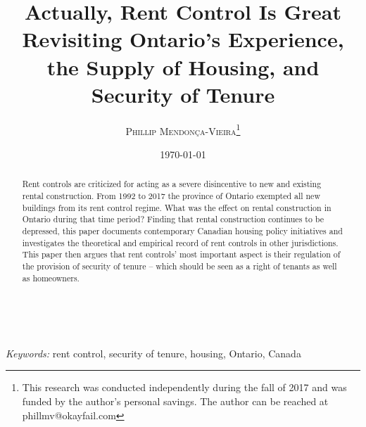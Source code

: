 \documentclass[letterpaper,12pt]{article} %
\title{\textsf{\textbf{Actually, Rent Control Is Great}\\ %
Revisiting Ontario's Experience, the Supply of Housing, and Security of Tenure}} %
\author{\textsc{Phillip Mendonça-Vieira}\footnote{ This research was conducted independently during the fall of 2017 and was funded by the author's personal savings. The author can be reached at phillmv@okayfail.com}}
\date{\today} %
\makeatletter
\renewcommand{\maketitle}{ %
\begin{flushright} %
{\LARGE\@title} %

\vspace{50pt} %

{\large\@author} %
\\\@date %

\vspace{40pt} %
\end{flushright}
}
\makeatother
\begin{document}
\maketitle %


\renewcommand{\abstractname}{\sffamily{Abstract}} %


\begin{abstract}
  Rent controls are criticized for acting as a severe disincentive to new and existing rental construction. From 1992 to 2017 the province of Ontario exempted all new buildings from its rent control regime. What was the effect on rental construction in Ontario during that time period? Finding that rental construction continues to be depressed, this paper documents contemporary Canadian housing policy initiatives and investigates the theoretical and empirical record of rent controls in other jurisdictions. This paper then argues that rent controls' most important aspect is their regulation of the provision of security of tenure -- which should be seen as a right of tenants as well as homeowners.
\end{abstract}

\hspace*{3,6mm}\textit{Keywords:} rent control, security of tenure, housing, Ontario, Canada %

\vspace{30pt} %

\end{document}
